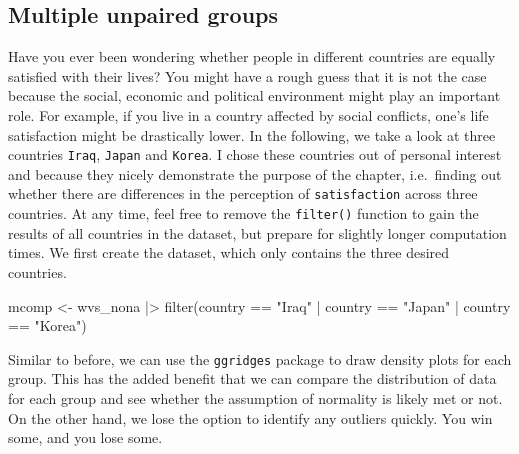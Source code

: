 \documentclass[
  letterpaper,
]{krantz}
\makeatletter
\newenvironment{Shaded}{\begin{snugshade}}{\end{snugshade}}
\newcommand{\FunctionTok}[1]{\textcolor[rgb]{0.28,0.35,0.67}{#1}}
\newcommand{\NormalTok}[1]{\textcolor[rgb]{0.00,0.23,0.31}{#1}}
\newcommand{\OtherTok}[1]{\textcolor[rgb]{0.00,0.23,0.31}{#1}}
\newcommand{\SpecialCharTok}[1]{\textcolor[rgb]{0.37,0.37,0.37}{#1}}
\newcommand{\StringTok}[1]{\textcolor[rgb]{0.13,0.47,0.30}{#1}}
\newenvironment{kframe}{%
\medskip{}
\setlength{\fboxsep}{.8em}
 \def\at@end@of@kframe{}%
 \ifinner\ifhmode%
  \def\at@end@of@kframe{\end{minipage}}%
  \begin{minipage}{\columnwidth}%
 \fi\fi%
 \def\FrameCommand##1{\hskip\@totalleftmargin \hskip-\fboxsep
 \colorbox{shadecolor}{##1}\hskip-\fboxsep
     \hskip-\linewidth \hskip-\@totalleftmargin \hskip\columnwidth}%
 \MakeFramed {\advance\hsize-\width
   \@totalleftmargin\z@ \linewidth\hsize
   \@setminipage}}%
 {\par\unskip\endMakeFramed%
 \at@end@of@kframe}
\renewenvironment{Shaded}{\begin{kframe}}{\end{kframe}}
\makeatother
\begin{document}
\subsection{Multiple unpaired
groups}\label{sec-multiple-unpaired-groups}

Have you ever been wondering whether people in different countries are
equally satisfied with their lives? You might have a rough guess that it
is not the case because the social, economic and political environment
might play an important role. For example, if you live in a country
affected by social conflicts, one's life satisfaction might be
drastically lower. In the following, we take a look at three countries
\texttt{Iraq}, \texttt{Japan} and \texttt{Korea}. I chose these
countries out of personal interest and because they nicely demonstrate
the purpose of the chapter, i.e.~finding out whether there are
differences in the perception of \texttt{satisfaction} across three
countries. At any time, feel free to remove the \texttt{filter()}
function to gain the results of all countries in the dataset, but
prepare for slightly longer computation times. We first create the
dataset, which only contains the three desired countries.

\begin{Shaded}
\begin{Highlighting}[]
\NormalTok{mcomp }\OtherTok{\textless{}{-}}
\NormalTok{  wvs\_nona }\SpecialCharTok{|\textgreater{}}
  \FunctionTok{filter}\NormalTok{(country }\SpecialCharTok{==} \StringTok{"Iraq"} \SpecialCharTok{|}
\NormalTok{           country }\SpecialCharTok{==} \StringTok{"Japan"} \SpecialCharTok{|}
\NormalTok{           country }\SpecialCharTok{==} \StringTok{"Korea"}\NormalTok{)}
\end{Highlighting}
\end{Shaded}

Similar to before, we can use the \texttt{ggridges} package to draw
density plots for each group. This has the added benefit that we can
compare the distribution of data for each group and see whether the
assumption of normality is likely met or not. On the other hand, we lose
the option to identify any outliers quickly. You win some, and you lose
some.
\end{document}
